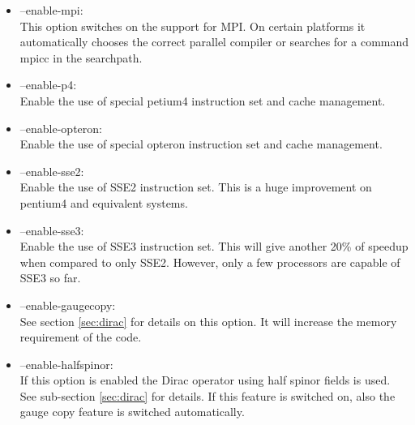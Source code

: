 \begin{itemize}
\item {\ttfamily --enable-mpi}:\\
  This option switches on the support for MPI. On certain platforms it
  automatically chooses the correct parallel compiler or searches for
  a command {\ttfamily mpicc} in the searchpath.

\item {\ttfamily --enable-p4}:\\
  Enable the use of special petium4 instruction set and cache
  management.

\item {\ttfamily --enable-opteron}:\\
  Enable the use of special opteron instruction set and cache
  management.


\item {\ttfamily --enable-sse2}:\\
  Enable the use of SSE2 instruction set. This is a huge improvement
  on pentium4 and equivalent systems.

\item {\ttfamily --enable-sse3}:\\
  Enable the use of SSE3 instruction set. This will give another 20\%
  of speedup when compared to only SSE2. However, only a few
  processors are capable of SSE3 so far.

\item {\ttfamily --enable-gaugecopy}:\\
  See section \ref{sec:dirac} for details on this option. It will
  increase the memory requirement of the code.

\item {\ttfamily --enable-halfspinor}:\\
  If this option is enabled the Dirac operator using half spinor
  fields is used. See sub-section \ref{sec:dirac} for details. If this
  feature is switched on, also the gauge copy feature is switched
  automatically. 



\end{itemize}
